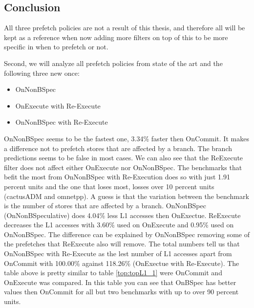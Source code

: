 \subsection{Conclusion}
All three prefetch policies are not a result of this thesis, and therefore all will be kept as a reference when now adding more filters on top of this to be more specific in when to prefetch or not.

Second, we will analyze all prefetch policies from state of the art and the following three new once:
\begin{itemize}
    \item OnNonBSpec
    \item OnExecute with Re-Execute
    \item OnNonBSpec with Re-Execute
\end{itemize}
\resExtime
{}
OnNonBSpec seems to be the fastest one, 3.34\% faster then OnCommit. It makes a difference not to prefetch stores that are affected by a branch. The branch predictions seems to be false in most cases. We can also see that the ReExecute filter does not affect either OnExecute nor OnNonBSpec.
The benchmarks that befit the most from OnNonBSpec with Re-Execution does so with just 1.91 percent units and the one that loses most, losses over 10 percent units (cactusADM and omnetpp). A guess is that the variation between the benchmark is the number of stores that are affected by a branch.
\resAcc
{}
OnNonBSpec (OnNonBSpeculative) does 4.04\% less L1 accesses then OnExectue. ReExecute decreases the L1 accesses with 3.60\% used on OnExecute and 0.95\% used on OnNonBSpec. The difference can be explained by OnNonBSpec removing some of the prefetches that ReExecute also will remove. The total numbers tell us that OnNonBSpec with Re-Execute as the lest number of L1 accesses apart from OnCommit with 100.00\% against 118.26\% (OnExectue with Re-Execute). 
The table above is pretty similar to table \ref{top:topL1_1} were OnCommit and OnExecute was compared. In this table you can see that OnBSpec has better values then OnCommit for all but two benchmarks with up to over 90 percent units. 
\resSp
{}
